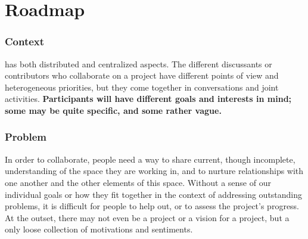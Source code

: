 \section{Roadmap} \label{sec:Roadmap}



\subsubsection*{Context}  has both distributed and centralized aspects. The different discussants or contributors who collaborate on a project have different points of view and heterogeneous priorities, but they come together in conversations and joint activities.
\textbf{Participants will have different goals and interests in mind; some may be quite specific, and some rather vague.}

\subsubsection*{Problem} In order to collaborate, people need a way to share current, though incomplete, understanding of the space they are working in, and to nurture relationships with one another and the other elements of this space.  Without a sense of our individual goals or how they fit together in the context of addressing outstanding problems, it is difficult for people to help out, or to assess the 
project's progress.  At the outset, there may not even be a project or a vision for a project, but a only loose collection of motivations and sentiments.   

